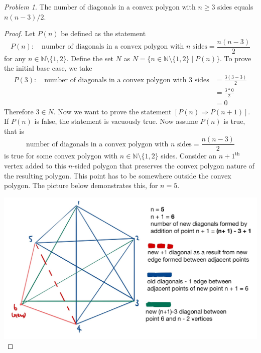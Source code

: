 \documentclass[11pt,twoside, reqno, align]{amsart}
\theoremstyle{remark}
\newtheorem{Prob}{Problem}
\def\N{\mathbb N}
\renewcommand{\implies}{\Rightarrow}
\begin{document}
\begin{Prob}
The number of diagonals in a convex polygon with $n \geq 3$ sides equals $n(n-3)/2$.
\end{Prob}

\begin{proof}
Let $P(n)$ be defined as the statement
$$
P(n): \quad \text{number of diagonals in a convex polygon with $n$ sides} = \frac{n(n-3)}{2}
$$
for any $n \in \N \setminus \{1,2\}$. Define the set $N$ as $N = \{ n \in \N \setminus \{1,2\} \mid P(n)\}$. To prove the initial base case, we take
\begin{align*}
    P(3): \quad \text{number of diagonals in a convex polygon with $3$ sides} & = \frac{3(3-3)}{2} \\
    & = \frac{3*0}{2} \\
    & = 0
\end{align*} 
Therefore $3 \in N$. Now we want to prove the statement $[P(n) \implies P(n+1)]$. If $P(n)$ is false, the statement is vacuously true. Now assume $P(n)$ is true, that is
$$
\text{number of diagonals in a convex polygon with $n$ sides} = \frac{n(n-3)}{2}
$$
is true for some convex polygon with $n \in \N \setminus \{1,2\}$ sides. Consider an ${n+1}^{\text{th}}$ vertex added to this $n$-sided polygon that preserves the convex polygon nature of the resulting polygon. This point has to be somewhere outside the convex polygon. The picture below demonstrates this, for $n = 5$.

\includegraphics[scale=0.20]{math0450q2picproof.jpg}


\end{proof}
\end{document}

